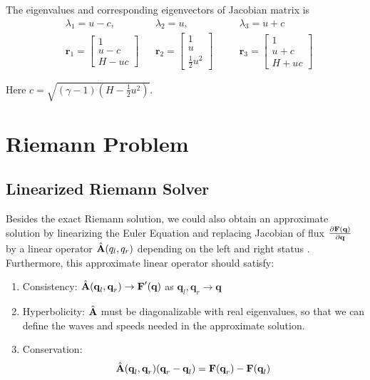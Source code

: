 \documentclass[11pt]{diazessay} %
\begin{document}
    The eigenvalues and corresponding eigenvectors of Jacobian matrix is
    $$
    \begin{aligned}
        & \lambda_1 = u -c, &&\lambda_2 = u,\quad && \lambda_3 = u+c\\
        &\textbf{r}_1 =\begin{bmatrix} 1 \\ u-c \\H-uc\end{bmatrix}
        &&\textbf{r}_2 =\begin{bmatrix} 1 \\ u \\ \frac{1}{2}u^2 \end{bmatrix}\quad
        &&\textbf{r}_3 =\begin{bmatrix} 1\\ u+c \\H+uc\end{bmatrix}
    \end{aligned}
    $$

    Here $c=\sqrt{(\gamma - 1)(H-\frac{1}{2}u^2)}$.    \cite{david_i_ketcheson_chapter_2020, roe_approximate_1981}

\section{Riemann Problem}
\subsection{Linearized Riemann Solver}

Besides the exact Riemann solution, we could also obtain an approximate solution by linearizing the Euler Equation and replacing Jacobian of flux $\frac{\partial \bf{F}(\textbf{q})}{\partial \bf{q}}$ by a linear operator $\hat{\bf{A}}(q_l, q_r)$ depending on the left and right status \cite{roe_approximate_1981}. Furthermore, this approximate linear operator should satisfy:


\begin{enumerate}

\item Consistency: $\hat{\bf{A}}(\textbf{q}_l, \textbf{q}_r) \rightarrow \textbf{F}'(\textbf{q})$ as $\textbf{q}_l, \textbf{q}_r \rightarrow \textbf{q}$
\item Hyperbolicity: $\hat{\bf{A}}$ must be diagonalizable with real eigenvalues, so that we can define the waves and speeds needed in the approximate solution.
\item Conservation: 
\begin{equation}\label{eq:conservation}
\hat{\bf{A}}(\textbf{q}_l, \textbf{q}_r)(\textbf{q}_r-\textbf{q}_l) = \textbf{F}(\textbf{q}_r) - \textbf{F}(\textbf{q}_l)
\end{equation}
\end{enumerate}
\end{document}
